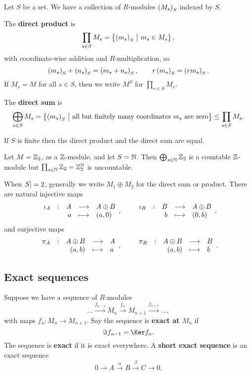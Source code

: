 Let $ S $ be a set. We have a collection of $ R $-modules $ \br{M_s}_S $ indexed by $ S $.

\begin{definition}
The \textbf{direct product} is
$$ \prod_{s \in S} M_s = \cbr{\br{m_s}_S \st m_s \in M_s}, $$
with coordinate-wise addition and $ R $-multiplication, so
$$ \br{m_s}_S + \br{n_s}_S = \br{m_s + n_s}_S, \qquad r\br{m_s}_S = \br{rm_s}_S. $$
If $ M_s = M $ for all $ s \in S $, then we write $ M^S $ for $ \prod_{s \in S} M_s $.
\end{definition}

\begin{definition}
The \textbf{direct sum} is
$$ \bigoplus_{s \in S} M_s = \cbr{\br{m_s}_S \st \text{all but finitely many coordinates} \ m_s \ \text{are zero}} \le \prod_{s \in S} M_s. $$
\end{definition}

If $ S $ is finite then the direct product and the direct sum are equal.

\begin{example*}
Let $ M = \mathbb{Z}_2 $, as a $ \mathbb{Z} $-module, and let $ S = \mathbb{N} $. Then $ \bigoplus_{s \in \mathbb{N}} \mathbb{Z}_2 $ is a countable $ \mathbb{Z} $-module but $ \prod_{s \in \mathbb{N}} \mathbb{Z}_2 = \mathbb{Z}_2^{\mathbb{N}} $ is uncountable.
\end{example*}

When $ \abs{S} = 2 $, generally we write $ M_1 \oplus M_2 $ for the direct sum or product. There are natural injective maps
$$ \function[\iota_A]{A}{A \oplus B}{a}{\br{a, 0}}, \qquad \function[\iota_B]{B}{A \oplus B}{b}{\br{0, b}}, $$
and surjective maps
$$ \function[\pi_A]{A \oplus B}{A}{\br{a, b}}{a}, \qquad \function[\pi_B]{A \oplus B}{B}{\br{a, b}}{b}. $$

\subsection{Exact sequences}

\begin{definition}
Suppose we have a sequence of $ R $-modules
$$ \dots \xrightarrow{f_{n - 1}} M_n \xrightarrow{f_n} M_{n + 1} \xrightarrow{f_{n + 1}} \dots, $$
with maps $ f_n : M_n \to M_{n + 1} $. Say the sequence is \textbf{exact at $ M_n $} if
$$ \Im f_{n - 1} = \Ker f_n. $$
The sequence is \textbf{exact} if it is exact everywhere. A \textbf{short exact sequence} is an exact sequence
$$ 0 \to A \xrightarrow{\alpha} B \xrightarrow{\beta} C \to 0. $$
\end{definition}

